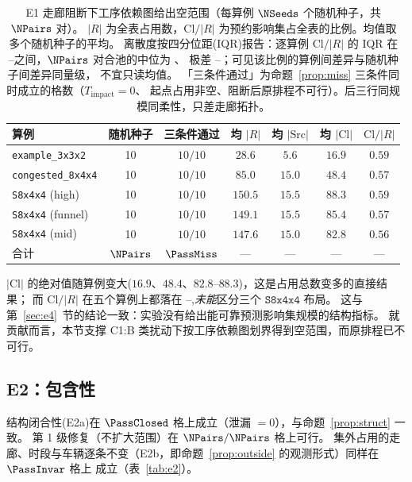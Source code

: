 \begin{table}[t]
\centering
\caption{E1 走廊阻断下工序依赖图给出空范围（每算例 \(\NSeeds\) 个随机种子，共 \(\NPairs\) 对）。
\(|R|\) 为全表占用数，\(\mathrm{Cl}/|R|\) 为预约影响集占全表的比例。均值取多个随机种子的平均。
离散度按四分位距(IQR)报告：逐算例 \(\mathrm{Cl}/|R|\) 的 IQR 在
\EoneFracIqrLo--\EoneFracIqrHi 之间，\(\NPairs\) 对合池的中位为 \EoneFracMed、
极差 \EoneFracMin--\EoneFracMax；可见该比例的算例间差异与随机种子间差异同量级，
不宜只读均值。
「三条件通过」为命题~\ref{prop:miss} 三条件同时成立的格数（\(T_{\mathrm{impact}}=0\)、
起点占用非空、阻断后原排程不可行）。后三行同规模同柔性，只差走廊拓扑。}
\label{tab:e1}
\small
\begin{tabular}{@{}lcccccc@{}}
\toprule
算例 & 随机种子 & 三条件通过 & 均 \(|R|\) & 均 \(|\mathrm{Src}|\)
 & 均 \(|\mathrm{Cl}|\) & \(\mathrm{Cl}/|R|\) \\
\midrule
\texttt{example\_3x3x2}   & 10 & \(10/10\) & \(28.6\)  & \(5.6\)  & \(16.9\) & \(0.59\) \\
\texttt{congested\_8x4x4} & 10 & \(10/10\) & \(85.0\)  & \(15.0\) & \(48.4\) & \(0.57\) \\
\texttt{S8x4x4} (high)    & 10 & \(10/10\) & \(150.5\) & \(15.5\) & \(88.3\) & \(0.59\) \\
\texttt{S8x4x4} (funnel)  & 10 & \(10/10\) & \(149.1\) & \(15.5\) & \(85.4\) & \(0.57\) \\
\texttt{S8x4x4} (mid)     & 10 & \(10/10\) & \(147.6\) & \(15.0\) & \(82.8\) & \(0.56\) \\
\midrule
合计 & \(\NPairs\) & \(\PassMiss\) & --- & --- & --- & --- \\
\bottomrule
\end{tabular}
\end{table}

\(|\mathrm{Cl}|\) 的绝对值随算例变大(\(16.9\)、\(48.4\)、\(82.8\)--\(88.3\))，这是占用总数变多的直接结果；
而 \(\mathrm{Cl}/|R|\) 在五个算例上都落在 \EoneCloLo--\EoneCloHi,\emph{未能}区分三个 \(\texttt{S8x4x4}\) 布局。
这与第~\ref{sec:e4}~节的结论一致：实验没有给出能可靠预测影响集规模的结构指标。
就贡献而言，本节支撑 C1:B 类扰动下按工序依赖图划界得到空范围，而原排程已不可行。

\subsection{E2：包含性}
\label{sec:e2}

结构闭合性(E2a)在 \(\PassClosed\) 格上成立（泄漏 \(=0\)），与命题~\ref{prop:struct} 一致。
第 1 级修复（不扩大范围）在 \(\NPairs/\NPairs\) 格上可行。
集外占用的走廊、时段与车辆逐条不变（E2b，即命题~\ref{prop:outside} 的观测形式）同样在 \(\PassInvar\) 格上
成立（表~\ref{tab:e2}）。

